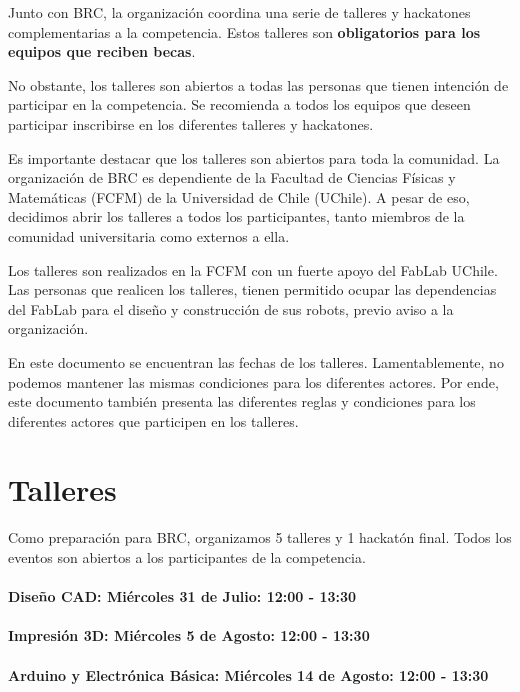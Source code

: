 Junto con BRC, la organización coordina una serie de talleres y hackatones complementarias a la competencia.
Estos talleres son \textbf{obligatorios para los equipos que reciben becas}.

No obstante, los talleres son abiertos a todas las personas que tienen intención de participar en la competencia.
Se recomienda a todos los equipos que deseen participar inscribirse en los diferentes talleres y hackatones.


Es importante destacar que los talleres son abiertos para toda la comunidad.
La organización de BRC es dependiente de la Facultad de Ciencias Físicas y Matemáticas (FCFM) de la Universidad de Chile (UChile).
A pesar de eso, decidimos abrir los talleres a todos los participantes, tanto miembros de la comunidad universitaria como externos a ella.

Los talleres son realizados en la FCFM con un fuerte apoyo del FabLab UChile.
Las personas que realicen los talleres, tienen permitido ocupar las dependencias del FabLab para el diseño y construcción de sus robots, previo aviso a la organización.

En este documento se encuentran las fechas de los talleres.
Lamentablemente, no podemos mantener las mismas condiciones para los diferentes actores.
Por ende, este documento también presenta las diferentes reglas y condiciones para los diferentes actores que participen en los talleres.

\section{Talleres}

Como preparación para BRC, organizamos 5 talleres y 1 hackatón final.
Todos los eventos son abiertos a los participantes de la competencia.

\paragraph*{Diseño CAD: Miércoles 31 de Julio: 12:00 - 13:30}

\paragraph*{Impresión 3D: Miércoles 5 de Agosto: 12:00 - 13:30}

\paragraph*{Arduino y Electrónica Básica: Miércoles 14 de Agosto: 12:00 - 13:30}

